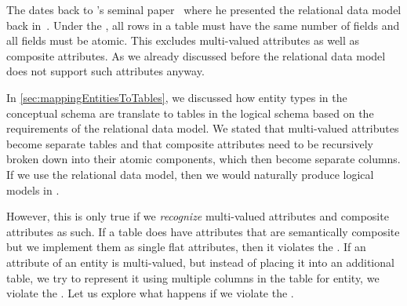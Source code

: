 %
\label{sec:normalForm:1}%
%
The  dates back to \citeauthor{C1970ARMODFLSDB}'s seminal paper~\cite{C1970ARMODFLSDB} where he presented the relational data model back in~\citeyear{C1970ARMODFLSDB}.
Under the , all rows in a table must have the same number of fields and all fields must be atomic.
This excludes multi-valued attributes as well as composite attributes.
As we already discussed before the relational data model does not support such attributes anyway.

In \cref{sec:mappingEntitiesToTables}, we discussed how entity types in the conceptual schema are translate to tables in the logical schema based on the requirements of the relational data model.
We stated that multi-valued attributes become separate tables and that composite attributes need to be recursively broken down into their atomic components, which then become separate columns.
If we use the relational data model, then we would naturally produce logical models in .

However, this is only true if we \emph{recognize} multi-valued attributes and composite attributes as such.
If a table does have attributes that are semantically composite but we implement them as single flat attributes, then it violates the .
If an attribute of an entity is multi-valued, but instead of placing it into an additional table, we try to represent it using multiple columns in the table for entity, we violate the .
Let us explore what happens if we violate the .%
%
\FloatBarrier%
%
%
\FloatBarrier%
\endhsection%
%
